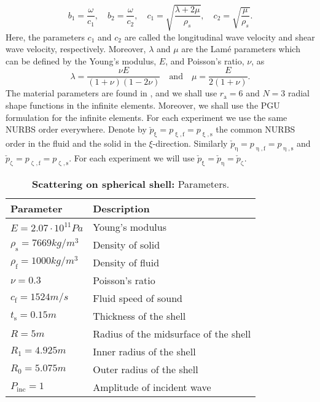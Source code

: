 \begin{equation*}
	b_1=\frac{\omega}{c_1},\quad b_2=\frac{\omega}{c_2},\quad c_1 = \sqrt{\frac{\lambda+2\mu}{\rho_s}},\quad c_2 = \sqrt{\frac{\mu}{\rho_s}}.
\end{equation*}
Here, the parameters $c_1$ and $c_2$ are called the longitudinal wave velocity and shear wave velocity, respectively. Moreover, $\lambda$ and $\mu$ are the Lam{\'e} parameters which can be defined by the Young's modulus, $E$, and Poisson's ratio, $\nu$, as
\begin{equation*}
	\lambda = \frac{\nu E}{(1+\nu)(1-2\nu)}\quad\text{and}\quad \mu = \frac{E}{2(1+\nu)}.
\end{equation*}
The material parameters are found in , and we shall use $r_{\mathrm{a}}=6$ and $N=3$ radial shape functions in the infinite elements. Moreover, we shall use the PGU formulation for the infinite elements. For each experiment we use the same NURBS order everywhere. Denote by $\check{p}_\upxi = p_{\upxi,\mathrm{f}} = p_{\upxi,\mathrm{s}}$ the common NURBS order in the fluid and the solid in the $\xi$-direction. Similarly $\check{p}_\upeta = p_{\upeta,\mathrm{f}} = p_{\upeta,\mathrm{s}}$ and $\check{p}_\upzeta = p_{\upzeta,\mathrm{f}} = p_{\upzeta,\mathrm{s}}$. For each experiment we will use $\check{p}_\upxi = \check{p}_\upeta = \check{p}_\upzeta$.

\begin{table}
	\centering
	\caption[Parameters for spherical shell]{\textbf{Scattering on spherical shell:} Parameters.}
	\label{Tab2:sphericalShellParameters}
	\begin{tabular}{l l}
		\toprule
		Parameter & Description\\
		\midrule
		$E = 2.07\cdot 10^{11}\unit{Pa}$ & Young's modulus\\
		$\rho_{\mathrm{s}} = 7669\unit{kg/m^3}$ & Density of solid\\
		$\rho_{\mathrm{f}} = 1000\unit{kg/m^3}$ & Density of fluid\\
		$\nu = 0.3$ & Poisson's ratio\\
		$c_{\mathrm{f}} = 1524\unit{m/s}$ & Fluid speed of sound\\
		$t_{\mathrm{s}} = 0.15\unit{m}$ & Thickness of the shell\\
		$R = 5\unit{m}$ & Radius of the midsurface of the shell\\
		$R_1 = 4.925\unit{m}$ & Inner radius of the shell\\
		$R_0 = 5.075\unit{m}$ & Outer radius of the shell\\
		$P_{\mathrm{inc}} = 1$ & Amplitude of incident wave\\
		\bottomrule
	\end{tabular}
\end{table}

